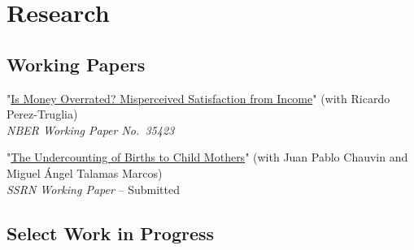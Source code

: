 \documentclass[11pt,letterpaper]{report}
\begin{document}
    \section*{Research}
    \subsection*{Working Papers}

      \begin{tablist}

            \item[2026] \tab{}"\href{https://www.nber.org/papers/w35423}{Is Money Overrated? Misperceived Satisfaction from Income}" (with Ricardo Perez-Truglia) \\
                              \textit{NBER Working Paper No.\ 35423}

            \item[2026] \tab{}"\href{https://papers.ssrn.com/sol3/papers.cfm?abstract_id=6153086}{The Undercounting of Births to Child Mothers}" (with Juan Pablo Chauvin and Miguel \'Angel Talamas Marcos) \\
                              \textit{SSRN Working Paper} -- Submitted

       \end{tablist}
    \subsection*{Select Work in Progress}
\end{document}
